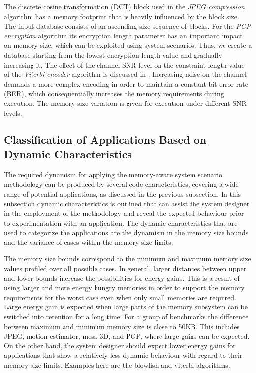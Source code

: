 \documentclass[a4paper,conference]{IEEEtran}
\begin{document}
The discrete cosine transformation (DCT) block used in the \textit{JPEG compression} algorithm has a memory footprint that is heavily influenced by the block size. The input database consists of an ascending size sequence of blocks. For the \textit{PGP encryption} algorithm its encryption length parameter has an important impact on memory size, which can be exploited using system scenarios. Thus, we create a database starting from the lowest encryption length value and gradually increasing it. The effect of the channel SNR level on the constraint length value of the \textit{Viterbi encoder} algorithm is discussed in \cite{Fil12}. Increasing noise on the channel demands a more complex encoding in order to maintain a constant bit error rate (BER), which consequentially increases the memory requirements during execution. The memory size variation is given for execution under different SNR levels.  

\subsection{Classification of Applications Based on Dynamic Characteristics}
\label{sec:categorisation}
The required dynamism for applying the memory-aware system scenario methodology can be produced by several code characteristics, covering a wide range of potential applications, as discussed in the previous subsection. In this subsection dynamic characteristics is outlined that can assist the system designer in the employment of the methodology and reveal the expected behaviour prior to experimentation with an application. The dynamic characteristics that are used to categorize the applications are the dynamism in the memory size bounds and the variance of cases within the memory size limits.

The memory size bounds correspond to the minimum and maximum memory size values profiled over all possible cases. In general, larger distances between upper and lower bounds increase the possibilities for energy gains. This is a result of using larger and more energy hungry memories in order to support the memory requirements for the worst case even when only small memories are required. Large energy gain is expected when large parts of the memory subsystem can be switched into retention for a long time. For a group of benchmarks the difference between maximum and minimum memory size is close to 50KB. This includes JPEG, motion estimator, mesa 3D, and PGP, where large gains can be expected. On the other hand, the system designer should expect lower energy gains for applications that show a relatively less dynamic behaviour with regard to their memory size limits. Examples here are the blowfish and viterbi algorithms. 
\end{document}
